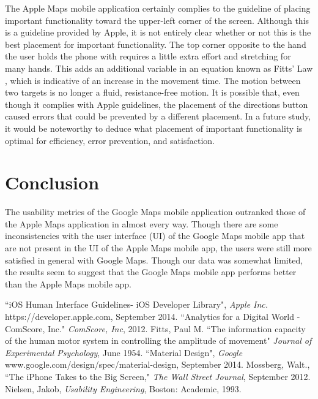 \documentclass[a4paper; 11pt]{article}
\begin{document}
\par
The Apple Maps mobile application certainly complies to the guideline of placing important functionality toward the upper-left corner of the screen. Although this is a guideline provided by Apple, it is not entirely clear whether or not this is the best placement for important functionality. The top corner opposite to the hand the user holds the phone with requires a little extra effort and stretching for many hands. This adds an additional variable in an equation known as Fitts' Law \cite{Fitts}, which is indicative of an increase in the movement time. The motion between two targets is no longer a fluid, resistance-free motion. It is possible that, even though it complies with Apple guidelines, the placement of the directions button caused errors that could be prevented by a different placement. In a future study, it would be noteworthy to deduce what placement of important functionality is optimal for efficiency, error prevention, and satisfaction.
%
\clearpage
\section{Conclusion}
The usability metrics of the Google Maps mobile application outranked those of the Apple Maps application in almost every way. Though there are some inconsistencies with the user interface (UI) of the Google Maps mobile app that are not present in the UI of the Apple Maps mobile app, the users were still more satisfied in general with Google Maps. Though our data was somewhat limited, the results seem to suggest that the Google Maps mobile app performs better than the Apple Maps mobile app.
\clearpage
\begin{thebibliography}{100} %
 ``iOS Human Interface Guidelines- iOS Developer Library", \emph{Apple Inc.} https://developer.apple.com, September 2014.
``Analytics for a Digital World - ComScore, Inc." \emph{ComScore, Inc}, 2012.
Fitts, Paul M. ``The information capacity of the human motor system in controlling the amplitude of movement" \emph{Journal of Experimental Psychology}, June 1954.
 ``Material Design", \emph{Google} www.google.com/design/spec/material-design, September 2014.
 Mossberg, Walt., ``The iPhone Takes to the Big Screen," \emph{The Wall Street Journal}, September 2012.
 Nielsen, Jakob, \emph{Usability Engineering}, Boston: Academic, 1993.
\end{thebibliography}
\end{document}
